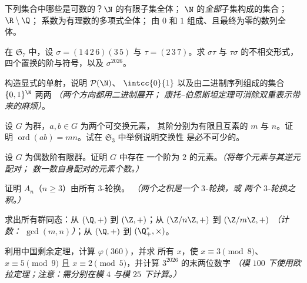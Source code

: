 \begin{exercise}[$\star$]\label{exo:b2:structures:1}
下列集合中哪些是可数的？$\N$ 的有限子集全体；
$\N$ 的\emph{全部}子集构成的集合；$\R \setminus \Q$；
系数为有理数的多项式全体；
由 $0$ 和 $1$ 组成、且最终为零的数列全体。
\end{exercise}

\begin{exercise}[$\star$]\label{exo:b2:structures:2}
在 $\mathfrak{S}_7$ 中，设 $\sigma = (1\,4\,2\,6)(3\,5)$ 与 $\tau =
(2\,3\,7)$。求 $\sigma\tau$ 与 $\tau\sigma$ 的不相交形式，
四个置换的阶与符号，以及
$\sigma^{2026}$。
\end{exercise}

\begin{exercise}[$\star$]\label{exo:b2:structures:3}
构造显式的单射，说明 $\mathcal{P}(\N)$、
$\intcc{0}{1}$ 以及由二进制序列组成的集合 $\{0,1\}^{\N}$ 两两
\emph{（两个方向都用二进制展开；
康托–伯恩斯坦定理可消除双重表示带来的麻烦）}。
\end{exercise}

\begin{exercise}[$\star$]\label{exo:b2:structures:4}
设 $G$ 为群，$a, b \in G$ 为两个可交换元素，
其阶分别为有限且互素的 $m$ 与 $n$。证明 $\operatorname{ord}(ab) =
mn$。试在 $\mathfrak{S}_3$ 中举例说明交换性
是必不可少的。
\end{exercise}

\begin{exercise}[$\star\star$]\label{exo:b2:structures:5}
设 $G$ 为偶数阶有限群。证明 $G$ 中存在
一个阶为 $2$ 的元素。\emph{（将每个元素与其逆元配对；
数一数自身配对的元素个数。）}
\end{exercise}

\begin{exercise}[$\star\star$]\label{exo:b2:structures:6}
证明 $A_n$（$n \geq 3$）由所有 $3$-轮换。
\emph{（两个之积是一个 $3$-轮换，或
两个 $3$-轮换之积。）}
\end{exercise}

\begin{exercise}[$\star\star$]\label{exo:b2:structures:7}
求出所有群同态：从 $(\Q, +)$ 到 $(\Z, +)$；从
$(\Z/n\Z, +)$ 到 $(\Z/m\Z, +)$ \emph{（计数：
$\gcd(m,n)$）}；从 $(\Q, +)$ 到 $(\Q_+^*, \times)$。
\end{exercise}

\begin{exercise}[$\star\star$]\label{exo:b2:structures:8}
利用中国剩余定理，计算 $\varphi(360)$，并求
所有 $x$，使 $x \equiv 3 \pmod 8$、$x \equiv 5 \pmod 9$ 且 $x
\equiv 2 \pmod 5$，并计算 $3^{2026}$ 的末两位数字
\emph{（模 $100$ 下使用欧拉定理；注意：需分别在模 $4$ 与模 $25$ 下计算。）}
\end{exercise}

